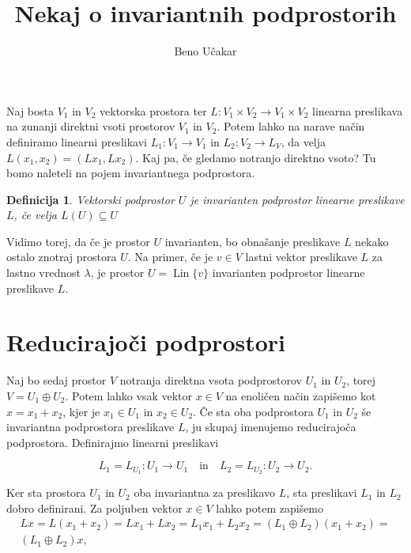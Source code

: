 \documentclass[a4paper,12pt]{article}
\newtheorem{definicija}{Definicija}
\DeclareMathOperator{\Lin}{Lin}
\begin{document}
\author{Beno Učakar}
\title{Nekaj o invariantnih podprostorih}
\date{}
\maketitle

Naj bosta $V_1$ in $V_2$ vektorska prostora ter $L \colon V_1 \times V_2 \to V_1 \times V_2$ linearna preslikava na zunanji direktni vsoti prostorov $V_1$ in $V_2$.
Potem lahko na narave način definiramo linearni preslikavi $L_1 \colon V_1 \to V_1$ in $L_2 \colon V_2 \to L_V$, da velja  
\(L(x_1, x_2) = (Lx_1, Lx_2).\)
Kaj pa, če gledamo notranjo direktno vsoto? Tu bomo naleteli na pojem invariantnega podprostora.

    \begin{definicija}
    Vektorski podprostor $U$ je \emph{invarianten podprostor} linearne preslikave $L$, če velja 
    $L(U) \subseteq U$
    \end{definicija}

Vidimo torej, da če je prostor $U$ invarianten, bo obnašanje preslikave $L$ nekako ostalo znotraj prostora $U$.
Na primer, če je $v \in V$ lastni vektor preslikave $L$ za lastno vrednost $\lambda$, je prostor 
\(U = \Lin \{ v \}\) invarianten podprostor linearne preslikave $L$.

\section*{Reducirajoči podprostori}

Naj bo sedaj prostor $V$ notranja direktna vsota podprostorov $U_1$ in $U_2$, torej $V = U_1 \oplus U_2$.
Potem lahko vsak vektor $x \in V$ na enoličen način zapišemo kot $x = x_1 + x_2$, kjer je $x_1 \in U_1$ in $x_2 \in U_2$.
Če sta oba podprostora $U_1$ in $U_2$ še invariantna podprostora preslikave $L$, ju skupaj imenujemo reducirajoča podprostora.
Definirajmo linearni preslikavi 

\[L_1 = L _{U_1} \colon U_1 \to U_1 \quad \text{in} \quad L_2 = L _{U_2} \colon U_2 \to U_2.\]

Ker sta prostora $U_1$ in $U_2$ oba invariantna za preslikavo $L$, sta preslikavi $L_1$ in $L_2$ dobro definirani.
Za poljuben vektor $x \in V$ lahko potem zapišemo 
\begin{multline}
    Lx = L(x_1 + x_2) = Lx_1+ Lx_2 = L_1x_1 + L_2x_2 = (L_1 \oplus L_2)(x_1 + x_2) = \\
    (L_1 \oplus L_2)x,
\end{multline}
\end{document}
